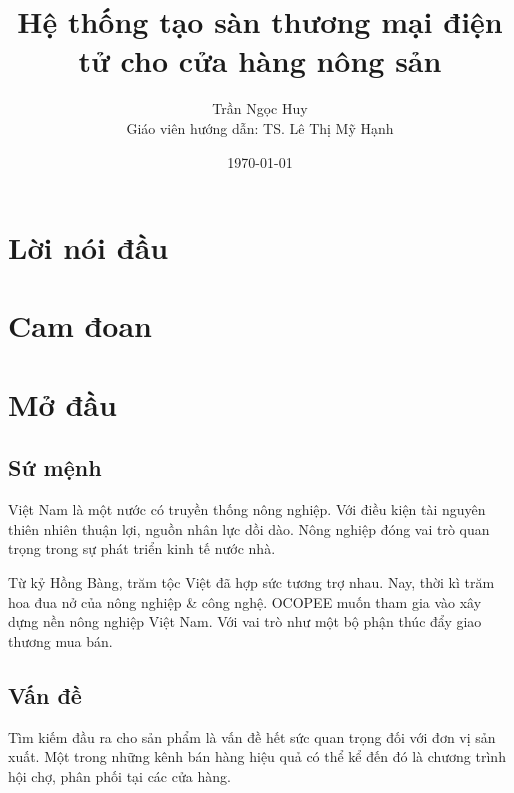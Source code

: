 \documentclass{report}
\title{Hệ thống tạo sàn thương mại điện tử cho cửa hàng nông sản}
\author{Trần Ngọc Huy\\[1cm]{\small Giáo viên hướng dẫn: TS. Lê Thị Mỹ Hạnh}}
\date{\today}
\begin{document}
	
	
\setcounter{page}{1}


\chapter*{Lời nói đầu}


\chapter*{Cam đoan}


\tableofcontents
{}


\listoffigures
{}

\listoftables
{}


\printglossary[title=Danh sách từ viết tắt, toctitle=Danh sách viết tắt]


\pagebreak




\setcounter{page}{1}

\chapter*{Mở đầu}

\section*{Sứ mệnh}
Việt Nam là một nước có truyền thống nông nghiệp. Với điều kiện tài nguyên thiên nhiên thuận lợi, nguồn nhân lực dồi
dào. Nông nghiệp đóng vai trò quan trọng trong sự phát triển kinh tế nước nhà.

Từ kỷ Hồng Bàng, trăm tộc Việt đã hợp sức tương trợ nhau. Nay, thời kì trăm hoa đua nở của nông nghiệp \& công nghệ. OCOPEE muốn tham gia vào xây dựng nền nông nghiệp Việt Nam. Với vai trò như một bộ phận thúc đẩy giao thương mua bán.
\pagebreak

\section*{Vấn đề}
Tìm kiếm đầu ra cho sản phẩm là vấn đề hết sức quan trọng đối với đơn vị sản xuất. Một trong những kênh bán hàng hiệu
quả có thể kể đến đó là chương trình hội chợ, phân phối tại các cửa hàng.
\end{document}
